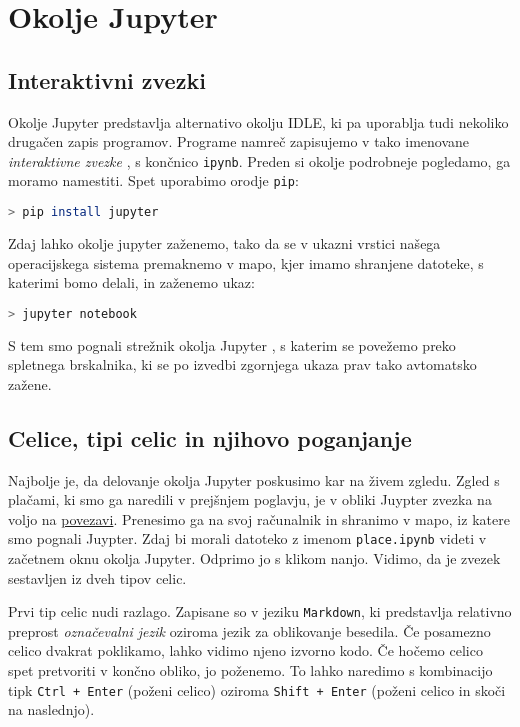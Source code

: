 \chapter{Okolje Jupyter}

\section{Interaktivni zvezki}
Okolje Jupyter predstavlja alternativo okolju IDLE, ki pa uporablja tudi nekoliko drugačen zapis programov. Programe namreč zapisujemo v tako imenovane \emph{interaktivne zvezke} , s končnico \texttt{ipynb}. Preden si okolje podrobneje pogledamo, ga moramo namestiti. Spet uporabimo orodje \texttt{pip}:
\begin{lstlisting}[language=bash]
> pip install jupyter
\end{lstlisting}
Zdaj lahko okolje jupyter zaženemo, tako da se v ukazni vrstici našega operacijskega sistema premaknemo v mapo, kjer imamo shranjene datoteke, s katerimi bomo delali, in zaženemo ukaz:
\begin{lstlisting}[language=bash]
> jupyter notebook
\end{lstlisting}
S tem smo pognali strežnik okolja Jupyter , s katerim se povežemo preko spletnega brskalnika, ki se po izvedbi zgornjega ukaza prav tako avtomatsko zažene. 

\section{Celice, tipi celic in njihovo poganjanje}
Najbolje je, da delovanje okolja Jupyter poskusimo kar na živem zgledu. Zgled s plačami, ki smo ga naredili v prejšnjem poglavju, je v obliki Juypter zvezka na voljo na \href{https://raw.githubusercontent.com/mmoskon/OP_skripta/master/resitve/place.ipynb}{povezavi}. Prenesimo ga na svoj računalnik in shranimo v mapo, iz katere smo pognali Juypter. Zdaj bi morali datoteko z imenom \texttt{place.ipynb} videti v začetnem oknu okolja Jupyter. Odprimo jo s klikom nanjo. Vidimo, da je zvezek sestavljen iz dveh tipov celic. 

Prvi tip celic nudi razlago. Zapisane so v jeziku \texttt{Markdown}, ki predstavlja relativno preprost \emph{označevalni jezik} oziroma jezik za oblikovanje besedila. Če posamezno celico dvakrat poklikamo, lahko vidimo njeno izvorno kodo. Če hočemo celico spet pretvoriti v končno obliko, jo poženemo. To lahko naredimo s kombinacijo tipk \texttt{Ctrl + Enter} (poženi celico) oziroma \texttt{Shift + Enter} (poženi celico in skoči na naslednjo).

